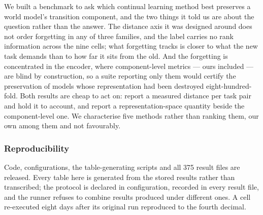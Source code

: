 \documentclass[11pt]{article}
\begin{document}
We built a benchmark to ask which continual learning method best preserves a
world model's transition component, and the two things it told us are about the
question rather than the answer. The distance axis it was designed around does
not order forgetting in any of three families, and the label carries no rank
information across the nine cells; what forgetting tracks is closer to what the
new task demands than to how far it sits from the old. And the forgetting is
concentrated in the encoder, where component-level metrics --- ours included
--- are blind by construction, so a suite reporting only them would certify the
preservation of models whose representation had been destroyed
eight-hundred-fold. Both results are cheap to act on: report a measured
distance per task pair and hold it to account, and report a
representation-space quantity beside the component-level one. We characterise
five methods rather than ranking them, our own among them and not favourably.

\subsubsection*{Reproducibility}

Code, configurations, the table-generating scripts and all 375 result files are
released. Every table here is generated from the stored results rather than
transcribed; the protocol is declared in configuration, recorded in every
result file, and the runner refuses to combine results produced under different
ones. A cell re-executed eight days after its original run reproduced to the
fourth decimal.



\end{document}
